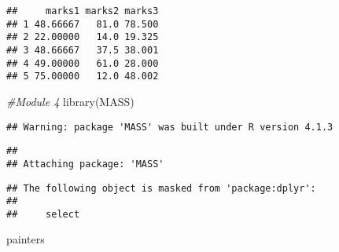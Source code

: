 \documentclass[
]{article}
\newenvironment{Shaded}{\begin{snugshade}}{\end{snugshade}}
\newcommand{\CommentTok}[1]{\textcolor[rgb]{0.56,0.35,0.01}{\textit{#1}}}
\newcommand{\FunctionTok}[1]{\textcolor[rgb]{0.00,0.00,0.00}{#1}}
\newcommand{\NormalTok}[1]{#1}
\begin{document}
\begin{verbatim}
##     marks1 marks2 marks3
## 1 48.66667   81.0 78.500
## 2 22.00000   14.0 19.325
## 3 48.66667   37.5 38.001
## 4 49.00000   61.0 28.000
## 5 75.00000   12.0 48.002
\end{verbatim}

\begin{Shaded}
\begin{Highlighting}[]
\CommentTok{\#Module 4}
\FunctionTok{library}\NormalTok{(MASS)}
\end{Highlighting}
\end{Shaded}

\begin{verbatim}
## Warning: package 'MASS' was built under R version 4.1.3
\end{verbatim}

\begin{verbatim}
## 
## Attaching package: 'MASS'
\end{verbatim}

\begin{verbatim}
## The following object is masked from 'package:dplyr':
## 
##     select
\end{verbatim}

\begin{Shaded}
\begin{Highlighting}[]
\NormalTok{painters}
\end{Highlighting}
\end{Shaded}
\end{document}
